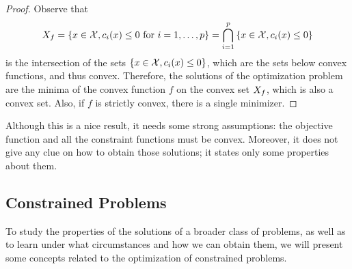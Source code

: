 \begin{proof}
    Observe that
    $$X_f = \left\{x \in \mathcal{X}, c_i(x) \leq 0 \text{ for } i=1, \ldots, p\right\} = \bigcap_{i=1}^p \left\{x \in \mathcal{X}, c_i(x) \leq 0\right\}$$ 
    is the intersection of the sets $\left\{x \in \mathcal{X}, c_i(x) \leq 0\right\}$, which are the sets below convex functions, and thus convex. Therefore, the solutions of the optimization problem are the minima of the convex function $f$ on the convex set $X_f$, which is also a convex set.
    Also, if $f$ is strictly convex, there is a single minimizer.
\end{proof}
Although this is a nice result, it needs some strong assumptions: the objective function and all the constraint functions must be convex. Moreover, it does not give any clue on how to obtain those solutions; it states only some properties about them.
%






\subsection{Constrained Problems}
To study the properties of the solutions of a broader class of problems, as well as to learn under what circumstances and how we can obtain them, we will present some concepts related to the optimization of constrained problems.
%

